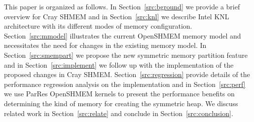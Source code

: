 This paper is organized as follows.
In Section~\ref{src:bground} we provide a brief overview for Cray SHMEM
and in Section~\ref{src:knl} we describe Intel KNL architecture with its
different modes of memory configuration. Section~\ref{src:mmodel}
illustrates the current OpenSHMEM memory model and necessitates the need
for changes in the existing memory model. In Section~\ref{src:smempart}
we propose the new symmetric memory partition feature and in
Section~\ref{src:implement} we follow up with
the implementation of the proposed changes in Cray SHMEM.
Section~\ref{src:regression} provide details of the performance
regression analysis on the implementation and in
Section~\ref{src:perf}
we use ParRes OpenSHMEM kernels to present the performance benefits on
determining the kind of memory for creating the symmetric heap. We
discuss related work in Section~\ref{src:relate} and conclude in
Section~\ref{src:conclusion}.